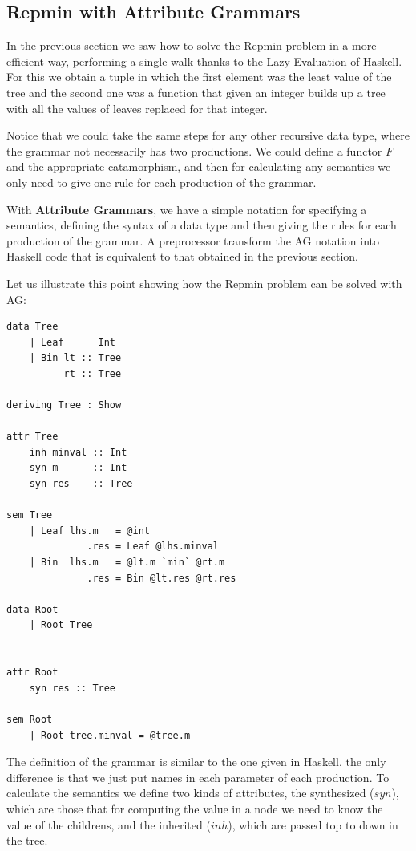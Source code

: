 \documentclass[a4paper,10pt]{article}
\begin{document}
\subsection{Repmin with Attribute Grammars}

In the previous section we saw how to solve the Repmin problem in a more efficient way, performing
a single walk thanks to the Lazy Evaluation of Haskell. For this we obtain a tuple in
which the first element was the least value of the tree and the second one was a function that
given an integer builds up a tree with all the values of leaves replaced for
that integer.

Notice that we could take the same steps for any other recursive data type, where the grammar
not necessarily has two productions. We could define a functor $F$ and the appropriate catamorphism,
and then for calculating any semantics we only need to give one rule for each production of the
grammar.

With \textbf{Attribute Grammars}, we have a simple notation for specifying a semantics, defining the
syntax of a data type and then giving the rules for each production of the grammar. A preprocessor
transform the AG notation into Haskell code that is equivalent to that obtained in the previous
section.

Let us illustrate this point showing how the Repmin problem can be solved with AG:

\begin{lstlisting}
data Tree
    | Leaf      Int
    | Bin lt :: Tree
	      rt :: Tree

deriving Tree : Show
	  
attr Tree
    inh minval :: Int
    syn m      :: Int
    syn res    :: Tree
      
sem Tree
    | Leaf lhs.m   = @int
              .res = Leaf @lhs.minval
	| Bin  lhs.m   = @lt.m `min` @rt.m
              .res = Bin @lt.res @rt.res

data Root
	| Root Tree
      
      
attr Root
	syn res :: Tree
      
sem Root
	| Root tree.minval = @tree.m
\end{lstlisting}

The definition of the grammar is similar to the one given in Haskell, the only difference is that we 
just put names in each parameter of each production. To calculate the semantics we define two kinds of 
attributes, the synthesized ($syn$), which are those that for computing the value in a node we need to 
know the value of the childrens, and the inherited ($inh$), which are passed top to down in the tree.
\end{document}
